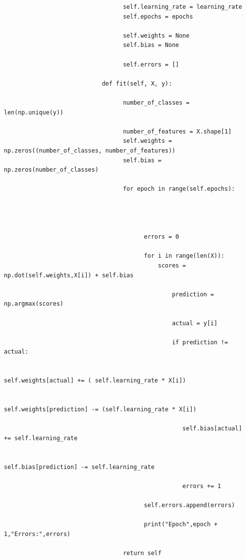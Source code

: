 \documentclass[12pt,a4paper]{article}
\begin{document}
\begin{lstlisting}
                                  self.learning_rate = learning_rate
                                  self.epochs = epochs

                                  self.weights = None
                                  self.bias = None

                                  self.errors = []

                            def fit(self, X, y):

                                  number_of_classes = len(np.unique(y))

                                  number_of_features = X.shape[1]
                                  self.weights = np.zeros((number_of_classes, number_of_features))
                                  self.bias = np.zeros(number_of_classes)

                                  for epoch in range(self.epochs):




                                        errors = 0

                                        for i in range(len(X)):
                                            scores = np.dot(self.weights,X[i]) + self.bias

                                                prediction = np.argmax(scores)

                                                actual = y[i]

                                                if prediction != actual:

                                                   self.weights[actual] += ( self.learning_rate * X[i])

                                                   self.weights[prediction] -= (self.learning_rate * X[i])

                                                   self.bias[actual] += self.learning_rate

                                                   self.bias[prediction] -= self.learning_rate

                                                   errors += 1

                                        self.errors.append(errors)

                                        print("Epoch",epoch + 1,"Errors:",errors)

                                  return self


\end{lstlisting}
\end{document}
